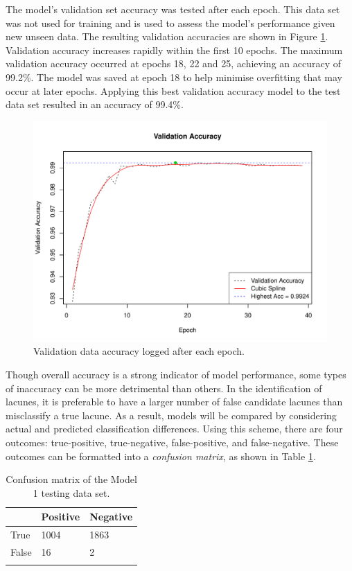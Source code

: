 The model's validation set accuracy was tested after each epoch. This data set was not used for training and is used to assess the model's performance given new unseen data. The resulting validation accuracies are shown in Figure \ref{results-valid-acc4-fig}. Validation accuracy increases rapidly within the first 10 epochs. The maximum validation accuracy occurred at epochs 18, 22 and 25, achieving an accuracy of 99.2\%. The model was saved at epoch 18 to help minimise overfitting that may occur at later epochs. Applying this best validation accuracy model to the test data set resulted in an accuracy of 99.4\%.

\begin{figure}[hb]
	\centering
	\includegraphics[width=\textwidth]{Images/7_valid_acc4.pdf}
	\caption{Validation data accuracy logged after each epoch.}
	\label{results-valid-acc4-fig}
\end{figure}

Though overall accuracy is a strong indicator of model performance, some types of inaccuracy can be more detrimental than others. In the identification of lacunes, it is preferable to have a larger number of false candidate lacunes than misclassify a true lacune. As a result, models will be compared by considering actual and predicted classification differences. Using this scheme, there are four outcomes: true-positive, true-negative, false-positive, and false-negative. These outcomes can be formatted into a \textit{confusion matrix}, as shown in Table \ref{results-confmat4-tab}.

\begin{table}[ht]
	\centering
	\begin{tabular}{@{}lll@{}}
	\toprule[1.5pt]
	& Positive & Negative\\
	\midrule
	True & 1004 & 1863\\
	False & 16 & 2\\
	\bottomrule[1.5pt]\\
	\end{tabular}
	\caption{Confusion matrix of the Model 1 testing data set.}
	\label{results-confmat4-tab}
\end{table}

